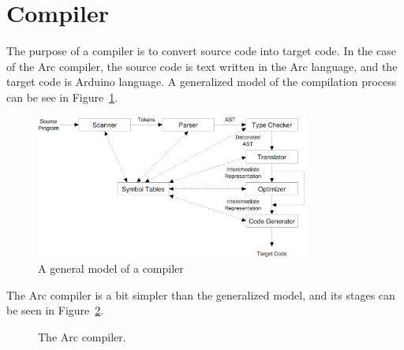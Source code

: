 \section{Compiler}\label{sec:compiler}
The purpose of a compiler is to convert source code into target code. In the case of the Arc compiler, the source code is text written in the Arc language, and the target code is Arduino language. A generalized model of the compilation process can be see in Figure~\ref{fig:generalcompilermodel}.


\begin{figure}[htb!]
    \centering
    \includegraphics[width=0.8\textwidth]{figures/Full_Compiler.png}
    \caption{A general model of a compiler~\cite{CraftingCompiler}}
    \label{fig:generalcompilermodel}
\end{figure}


The Arc compiler is a bit simpler than the generalized model, and its stages can be seen in Figure~\ref{fig:arccompilermodel}.


\begin{figure}[htb!]
    \centering
    \caption{The Arc compiler.}
    \label{fig:arccompilermodel}
\end{figure}


